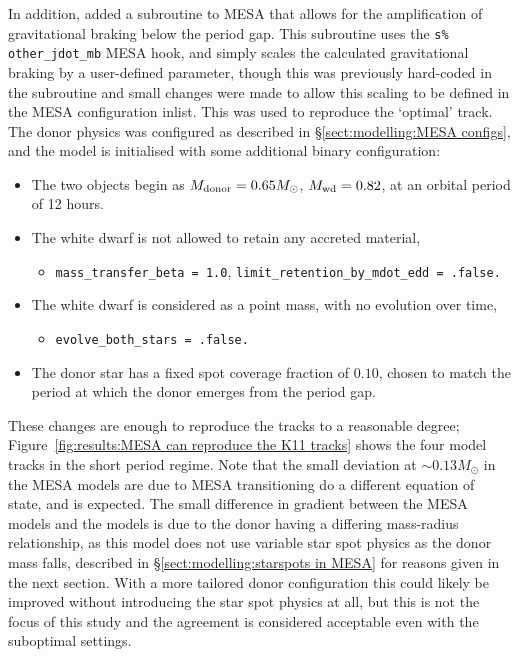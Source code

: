 In addition, \citet{Pala2017a} added a subroutine to MESA that allows for the amplification of gravitational braking below the period gap.
This subroutine uses the \lstinline{s% other_jdot_mb} MESA hook, and simply scales the calculated gravitational braking by a user-defined parameter, though this was previously hard-coded in the subroutine and small changes were made to allow this scaling to be defined in the MESA configuration inlist.
This was used to reproduce the `optimal' track. The donor physics was configured as described in \S\ref{sect:modelling:MESA configs}, and the model is initialised with some additional binary configuration:
\begin{itemize}
    \item The two objects begin as $M_{\rm donor} = 0.65 M_\odot$, $M_{\rm wd} = 0.82$, at an orbital period of 12 hours.
    \item The white dwarf is not allowed to retain any accreted material,
    \begin{itemize}
        \item \lstinline{mass_transfer_beta = 1.0}, \lstinline{limit_retention_by_mdot_edd = .false.}
    \end{itemize}
    \item The white dwarf is considered as a point mass, with no evolution over time,
    \begin{itemize}
        \item \lstinline{evolve_both_stars = .false.}
    \end{itemize}
    \item The donor star has a fixed spot coverage fraction of $0.10$, chosen to match the period at which the donor emerges from the period gap.
\end{itemize}

These changes are enough to reproduce the \citet{knigge11} tracks to a reasonable degree; Figure~\ref{fig:results:MESA can reproduce the K11 tracks} shows the four model tracks in the short period regime.
Note that the small deviation at $\sim 0.13 M_\odot$ in the MESA models are due to MESA transitioning do a different equation of state, and is expected.
The small difference in gradient between the MESA models and the \citet{knigge11} models is due to the donor having a differing mass-radius relationship, as this model does not use variable star spot physics as the donor mass falls, described in \S\ref{sect:modelling:starspots in MESA} for reasons given in the next section.
With a more tailored donor configuration this could likely be improved without introducing the star spot physics at all, but this is not the focus of this study and the agreement is considered acceptable even with the suboptimal settings.

